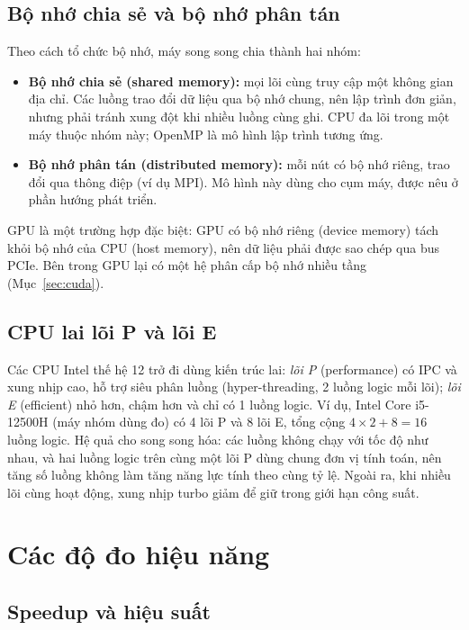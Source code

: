 \subsection{Bộ nhớ chia sẻ và bộ nhớ phân tán}

Theo cách tổ chức bộ nhớ, máy song song chia thành hai nhóm:
\begin{itemize}
\item \textbf{Bộ nhớ chia sẻ (shared memory):} mọi lõi cùng truy cập một không gian địa chỉ. Các luồng trao đổi dữ liệu qua bộ nhớ chung, nên lập trình đơn giản, nhưng phải tránh xung đột khi nhiều luồng cùng ghi. CPU đa lõi trong một máy thuộc nhóm này; OpenMP là mô hình lập trình tương ứng.
\item \textbf{Bộ nhớ phân tán (distributed memory):} mỗi nút có bộ nhớ riêng, trao đổi qua thông điệp (ví dụ MPI). Mô hình này dùng cho cụm máy, được nêu ở phần hướng phát triển.
\end{itemize}
GPU là một trường hợp đặc biệt: GPU có bộ nhớ riêng (device memory) tách khỏi bộ nhớ của CPU (host memory), nên dữ liệu phải được sao chép qua bus PCIe. Bên trong GPU lại có một hệ phân cấp bộ nhớ nhiều tầng (Mục~\ref{sec:cuda}).

\subsection{CPU lai lõi P và lõi E}

Các CPU Intel thế hệ 12 trở đi dùng kiến trúc lai: \emph{lõi P} (performance) có IPC và xung nhịp cao, hỗ trợ siêu phân luồng (hyper-threading, 2 luồng logic mỗi lõi); \emph{lõi E} (efficient) nhỏ hơn, chậm hơn và chỉ có 1 luồng logic. Ví dụ, Intel Core i5-12500H (máy nhóm dùng đo) có 4 lõi P và 8 lõi E, tổng cộng $4\times2+8=16$ luồng logic. Hệ quả cho song song hóa: các luồng không chạy với tốc độ như nhau, và hai luồng logic trên cùng một lõi P dùng chung đơn vị tính toán, nên tăng số luồng không làm tăng năng lực tính theo cùng tỷ lệ. Ngoài ra, khi nhiều lõi cùng hoạt động, xung nhịp turbo giảm để giữ trong giới hạn công suất.

\section{Các độ đo hiệu năng}
\label{sec:do-do}

\subsection{Speedup và hiệu suất}

